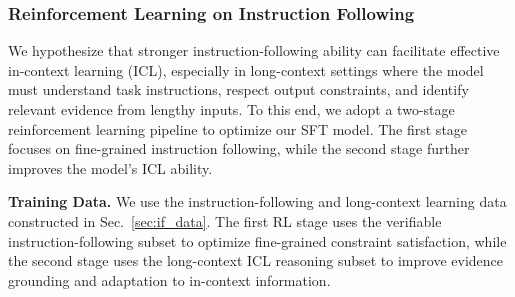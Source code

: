 \documentclass{llmxive}
\begin{document}
\subsubsection{Reinforcement Learning on Instruction Following}

We hypothesize that stronger instruction-following ability can facilitate effective in-context learning (ICL), especially in long-context settings where the model must understand task instructions, respect output constraints, and identify relevant evidence from lengthy inputs. To this end, we adopt a two-stage reinforcement learning pipeline to optimize our SFT model. The first stage focuses on fine-grained instruction following, while the second stage further improves the model's ICL ability.

\textbf{Training Data.}
We use the instruction-following and long-context learning data constructed in Sec.~\ref{sec:if_data}. The first RL stage uses the verifiable instruction-following subset to optimize fine-grained constraint satisfaction, while the second stage uses the long-context ICL reasoning subset to improve evidence grounding and adaptation to in-context information.
\end{document}
